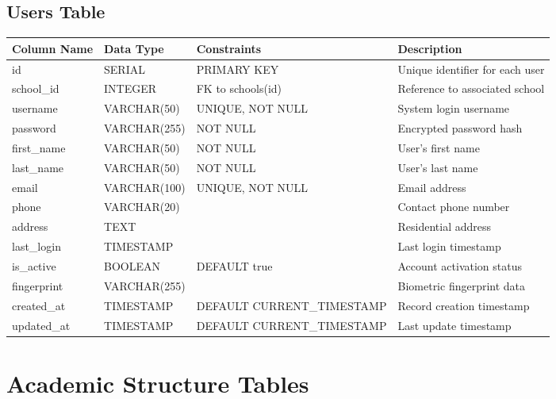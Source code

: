 \documentclass[11pt,a4paper]{article}
\begin{document}
\subsection{Users Table}
\begin{longtable}{|p{3cm}|p{3cm}|p{2cm}|p{6cm}|}
\hline
\textbf{Column Name} & \textbf{Data Type} & \textbf{Constraints} & \textbf{Description} \\
\hline
\endhead
id & SERIAL & PRIMARY KEY & Unique identifier for each user \\
\hline
school\_id & INTEGER & FK to schools(id) & Reference to associated school \\
\hline
username & VARCHAR(50) & UNIQUE, NOT NULL & System login username \\
\hline
password & VARCHAR(255) & NOT NULL & Encrypted password hash \\
\hline
first\_name & VARCHAR(50) & NOT NULL & User's first name \\
\hline
last\_name & VARCHAR(50) & NOT NULL & User's last name \\
\hline
email & VARCHAR(100) & UNIQUE, NOT NULL & Email address \\
\hline
phone & VARCHAR(20) & & Contact phone number \\
\hline
address & TEXT & & Residential address \\
\hline
last\_login & TIMESTAMP & & Last login timestamp \\
\hline
is\_active & BOOLEAN & DEFAULT true & Account activation status \\
\hline
fingerprint & VARCHAR(255) & & Biometric fingerprint data \\
\hline
created\_at & TIMESTAMP & DEFAULT CURRENT\_TIMESTAMP & Record creation timestamp \\
\hline
updated\_at & TIMESTAMP & DEFAULT CURRENT\_TIMESTAMP & Last update timestamp \\
\hline
\end{longtable}

\section{Academic Structure Tables}
\end{document}
